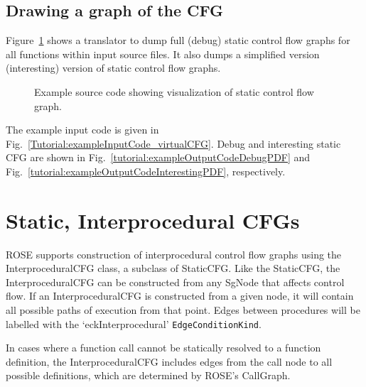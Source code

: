 \subsection{Drawing a graph of the CFG}
Figure~\ref{Tutorial:BuildStaticCFG} shows a translator to dump 
full (debug) static control flow graphs for all functions within input
source files. It also dumps a simplified version (interesting) version of 
static control flow graphs. 

\begin{figure}[!h]
{\indent
  {\mySmallFontSize
    \begin{latexonly}
    
    \end{latexonly}

    \begin{htmlonly}
    
    \end{htmlonly}

  }
}
\label{Tutorial:BuildStaticCFG}
\caption{Example source code showing visualization of static control flow graph.}
\end{figure}

The example input code is given in
Fig.~\ref{Tutorial:exampleInputCode_virtualCFG}. Debug and interesting static CFG 
are shown in Fig.~\ref{tutorial:exampleOutputCodeDebugPDF} and
Fig.~\ref{tutorial:exampleOutputCodeInterestingPDF}, respectively.

\section{Static, Interprocedural CFGs}

ROSE supports construction of interprocedural control flow graphs using the InterproceduralCFG class, 
a subclass of StaticCFG. Like the StaticCFG, the InterproceduralCFG can be constructed 
from any SgNode that affects control flow. If an InterproceduralCFG is constructed from a given node, 
it will contain all possible paths of execution from that point. 
Edges between procedures will be labelled with the `eckInterprocedural' 
{\tt EdgeConditionKind}.

In cases where a function call cannot be statically resolved to a function definition, the 
InterproceduralCFG includes edges from the call node to all possible definitions, which are
determined by ROSE's CallGraph.  



